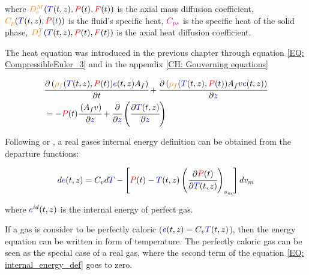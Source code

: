 \documentclass[../Article_Model_Parameters.tex]{subfiles}
\begin{document}
		where $ {\color{orange}D^M_e}({\color{blue}T}(t,z),{\color{red}P}(t),{\color{red}F}(t))$ is the axial mass diffusion coefficient, ${\color{orange}C_p}({\color{blue}T}(t,z),{\color{red}P}(t))$ is the fluid's specific heat, ${\color{magenta}C_{ps}}$ is the specific heat of the solid phase, ${\color{orange}D^T_e}({\color{blue}T}(t,z),{\color{red}P}(t),{\color{red}F}(t))$ is the axial heat diffusion coefficient. 

		\fi
		
			The heat equation was introduced in the previous chapter through equation \ref{EQ: CompressibleEuler_3} and in the appendix \ref{CH: Gouverning equations} 
			
			{\footnotesize
			\begin{align}
				&\cfrac{\partial \left( {\color{orange}\rho_f}({\color{blue}T}(t,z),{\color{red}P}(t)) {\color{blue}e}(t,z) A_f \right) }{\partial t} + \cfrac{\partial \left( {\color{orange}\rho_f}({\color{blue}T}(t,z),{\color{red}P}(t)) A_f v {\color{blue}e}(t,z) \right)}{\partial {\color{blue}z}} \nonumber \\
				&= -{\color{red}P}(t)\cfrac{\left( A_f v \right)}{\partial {\color{blue}z}} + \cfrac{\partial}{\partial {\color{blue}z}} \left( \cfrac{\partial {\color{blue}T}(t,z)}{\partial {\color{blue}z}} \right) 
			\end{align}
			}
		
			Following \citet{Elliott2011} or \citet{Gmehling2019}, a real gases internal energy definition can be obtained from the departure functions:

			{\footnotesize
				\begin{equation}
					d{\color{blue}e}(t,z)=C_vd{\color{blue}T}-\left[{\color{red}P}(t)-{\color{blue}T}(t,z)\left(\cfrac{\partial {\color{red}P}(t)}{\partial {\color{blue}T}(t,z)}\right)_{v_m}\right]dv_m
					\label{EQ: internal_energy_def}
				\end{equation} }
			
			where ${\color{blue}e}^{id}(t,z)$ is the internal energy of perfect gas.
			
			If a gas is consider to be perfectly caloric (${\color{blue}e}(t,z)=C_v {\color{blue}T}(t,z)$), then the energy equation can be written in form of temperature. The perfectly caloric gas can be seen as the special case of a real gas, where the second term of the equation \ref{EQ: internal_energy_def} goes to zero.
			
\end{document}
